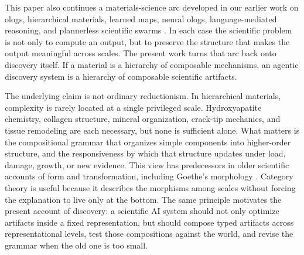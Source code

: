 \documentclass[11pt]{article}
\theoremstyle{definition}
\begin{document}
This paper also continues a materials-science arc developed in our earlier work on ologs, hierarchical materials, learned maps, neural ologs, language-mediated reasoning, and plannerless scientific swarms \citep{buehler_spivak_2011,giesa_spivak_2011_patterns,giesa_spivak_2012_buildingblock,buehler_fieldperceiver_2022,buehler_atoms_to_swarms_2026}. In each case the scientific problem is not only to compute an output, but to preserve the structure that makes the output meaningful across scales. The present work turns that arc back onto discovery itself. If a material is a hierarchy of composable mechanisms, an agentic discovery system is a hierarchy of composable scientific artifacts.

The underlying claim is not ordinary reductionism. In hierarchical materials, complexity is rarely located at a single privileged scale. Hydroxyapatite chemistry, collagen structure, mineral organization, crack-tip mechanics, and tissue remodeling are each necessary, but none is sufficient alone. What matters is the compositional grammar that organizes simple components into higher-order structure, and the responsiveness by which that structure updates under load, damage, growth, or new evidence. This view has predecessors in older scientific accounts of form and transformation, including Goethe's morphology \citep{goethe_metamorphosis_1790}. Category theory is useful because it describes the morphisms among scales without forcing the explanation to live only at the bottom. The same principle motivates the present account of discovery: a scientific AI system should not only optimize artifacts inside a fixed representation, but should compose typed artifacts across representational levels, test those compositions against the world, and revise the grammar when the old one is too small.
\end{document}
